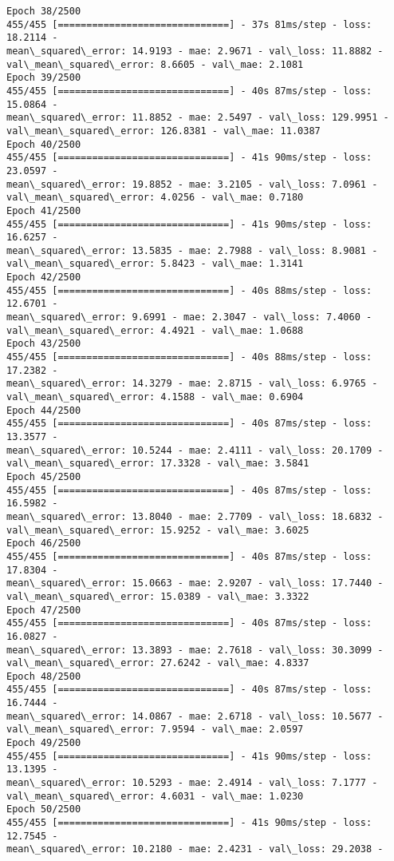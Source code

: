 \documentclass[11pt]{article}
\begin{document}
\begin{Verbatim}[commandchars=\\\{\}]
Epoch 38/2500
455/455 [==============================] - 37s 81ms/step - loss: 18.2114 -
mean\_squared\_error: 14.9193 - mae: 2.9671 - val\_loss: 11.8882 -
val\_mean\_squared\_error: 8.6605 - val\_mae: 2.1081
Epoch 39/2500
455/455 [==============================] - 40s 87ms/step - loss: 15.0864 -
mean\_squared\_error: 11.8852 - mae: 2.5497 - val\_loss: 129.9951 -
val\_mean\_squared\_error: 126.8381 - val\_mae: 11.0387
Epoch 40/2500
455/455 [==============================] - 41s 90ms/step - loss: 23.0597 -
mean\_squared\_error: 19.8852 - mae: 3.2105 - val\_loss: 7.0961 -
val\_mean\_squared\_error: 4.0256 - val\_mae: 0.7180
Epoch 41/2500
455/455 [==============================] - 41s 90ms/step - loss: 16.6257 -
mean\_squared\_error: 13.5835 - mae: 2.7988 - val\_loss: 8.9081 -
val\_mean\_squared\_error: 5.8423 - val\_mae: 1.3141
Epoch 42/2500
455/455 [==============================] - 40s 88ms/step - loss: 12.6701 -
mean\_squared\_error: 9.6991 - mae: 2.3047 - val\_loss: 7.4060 -
val\_mean\_squared\_error: 4.4921 - val\_mae: 1.0688
Epoch 43/2500
455/455 [==============================] - 40s 88ms/step - loss: 17.2382 -
mean\_squared\_error: 14.3279 - mae: 2.8715 - val\_loss: 6.9765 -
val\_mean\_squared\_error: 4.1588 - val\_mae: 0.6904
Epoch 44/2500
455/455 [==============================] - 40s 87ms/step - loss: 13.3577 -
mean\_squared\_error: 10.5244 - mae: 2.4111 - val\_loss: 20.1709 -
val\_mean\_squared\_error: 17.3328 - val\_mae: 3.5841
Epoch 45/2500
455/455 [==============================] - 40s 87ms/step - loss: 16.5982 -
mean\_squared\_error: 13.8040 - mae: 2.7709 - val\_loss: 18.6832 -
val\_mean\_squared\_error: 15.9252 - val\_mae: 3.6025
Epoch 46/2500
455/455 [==============================] - 40s 87ms/step - loss: 17.8304 -
mean\_squared\_error: 15.0663 - mae: 2.9207 - val\_loss: 17.7440 -
val\_mean\_squared\_error: 15.0389 - val\_mae: 3.3322
Epoch 47/2500
455/455 [==============================] - 40s 87ms/step - loss: 16.0827 -
mean\_squared\_error: 13.3893 - mae: 2.7618 - val\_loss: 30.3099 -
val\_mean\_squared\_error: 27.6242 - val\_mae: 4.8337
Epoch 48/2500
455/455 [==============================] - 40s 87ms/step - loss: 16.7444 -
mean\_squared\_error: 14.0867 - mae: 2.6718 - val\_loss: 10.5677 -
val\_mean\_squared\_error: 7.9594 - val\_mae: 2.0597
Epoch 49/2500
455/455 [==============================] - 41s 90ms/step - loss: 13.1395 -
mean\_squared\_error: 10.5293 - mae: 2.4914 - val\_loss: 7.1777 -
val\_mean\_squared\_error: 4.6031 - val\_mae: 1.0230
Epoch 50/2500
455/455 [==============================] - 41s 90ms/step - loss: 12.7545 -
mean\_squared\_error: 10.2180 - mae: 2.4231 - val\_loss: 29.2038 -

\end{Verbatim}
\end{document}
